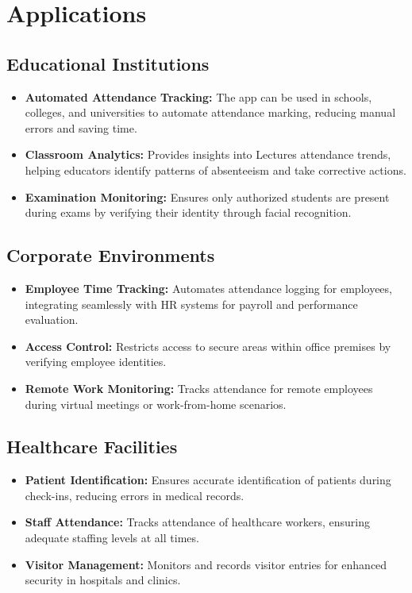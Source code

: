 \documentclass[openany]{report}
\begin{document}
\chapter{Applications}

\section{Educational Institutions}
\begin{itemize}
    \item \textbf{Automated Attendance Tracking:} The app can be used in schools, colleges, and universities to automate attendance marking, reducing manual errors and saving time.
    \item \textbf{Classroom Analytics:} Provides insights into Lectures attendance trends, helping educators identify patterns of absenteeism and take corrective actions.
    \item \textbf{Examination Monitoring:} Ensures only authorized students are present during exams by verifying their identity through facial recognition.
\end{itemize}

\section{Corporate Environments}
\begin{itemize}
    \item \textbf{Employee Time Tracking:} Automates attendance logging for employees, integrating seamlessly with HR systems for payroll and performance evaluation.
    \item \textbf{Access Control:} Restricts access to secure areas within office premises by verifying employee identities.
    \item \textbf{Remote Work Monitoring:} Tracks attendance for remote employees during virtual meetings or work-from-home scenarios.
\end{itemize}

\section{Healthcare Facilities}
\begin{itemize}
    \item \textbf{Patient Identification:} Ensures accurate identification of patients during check-ins, reducing errors in medical records.
    \item \textbf{Staff Attendance:} Tracks attendance of healthcare workers, ensuring adequate staffing levels at all times.
    \item \textbf{Visitor Management:} Monitors and records visitor entries for enhanced security in hospitals and clinics.
\end{itemize}
\end{document}
